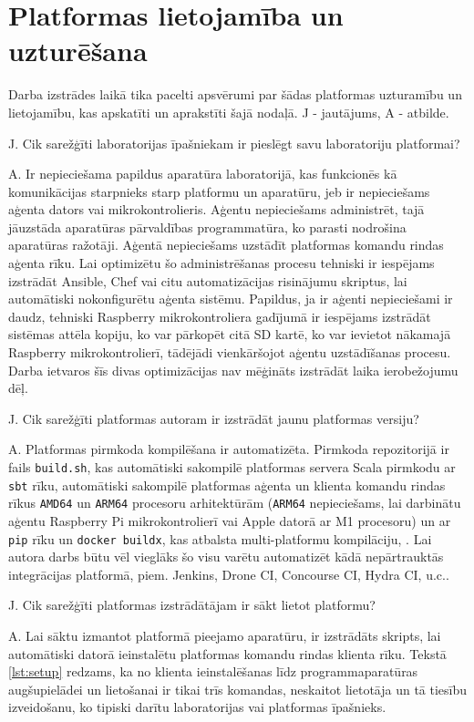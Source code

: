 \section{Platformas lietojamība un uzturēšana}
\label{sec:maintenance}

Darba izstrādes laikā tika pacelti apsvērumi par šādas platformas uzturamību un
lietojamību, kas apskatīti un aprakstīti šajā nodaļā. J - jautājums, A -
atbilde.

J. Cik sarežģīti laboratorijas īpašniekam ir pieslēgt savu laboratoriju
platformai?

A. Ir nepieciešama papildus aparatūra laboratorijā, kas funkcionēs kā
komunikācijas starpnieks starp platformu un aparatūru, jeb ir nepieciešams
aģenta dators vai mikrokontrolieris. Aģentu nepieciešams administrēt, tajā
jāuzstāda aparatūras pārvaldības programmatūra, ko parasti nodrošina aparatūras
ražotāji. Aģentā nepieciešams uzstādīt platformas komandu rindas aģenta rīku.
Lai optimizētu šo administrēšanas procesu tehniski ir iespējams izstrādāt
Ansible, Chef vai citu automatizācijas risinājumu skriptus, lai automātiski
nokonfigurētu aģenta sistēmu. Papildus, ja ir aģenti nepieciešami ir daudz,
tehniski Raspberry mikrokontroliera gadījumā ir iespējams izstrādāt sistēmas
attēla kopiju, ko var pārkopēt citā SD kartē, ko var ievietot nākamajā Raspberry
mikrokontrolierī, tādējādi vienkāršojot aģentu uzstādīšanas procesu. Darba
ietvaros šīs divas optimizācijas nav mēģināts izstrādāt laika ierobežojumu dēļ.

J. Cik sarežģīti platformas autoram ir izstrādāt jaunu platformas versiju?

A. Platformas pirmkoda kompilēšana ir automatizēta. Pirmkoda repozitorijā ir
fails \lstinline!build.sh!, kas automātiski sakompilē platformas servera Scala
pirmkodu ar \lstinline!sbt! rīku, automātiski sakompilē platformas aģenta un
klienta komandu rindas rīkus \lstinline!AMD64! un \lstinline!ARM64! procesoru
arhitektūrām (\lstinline!ARM64! nepieciešams, lai darbinātu aģentu Raspberry Pi
mikrokontrolierī vai Apple datorā ar M1 procesoru) un ar \lstinline!pip! rīku un
\lstinline!docker buildx!, kas atbalsta multi-platformu kompilāciju,
\cite{DockerBuildx}. Lai autora darbs būtu vēl vieglāks šo visu varētu
automatizēt kādā nepārtrauktās integrācijas platformā, piem. Jenkins, Drone CI,
Concourse CI, Hydra CI, u.c..

J. Cik sarežģīti platformas izstrādātājam ir sākt lietot platformu?

A. Lai sāktu izmantot platformā pieejamo aparatūru, ir izstrādāts skripts, lai
automātiski datorā ieinstalētu platformas komandu rindas klienta rīku. Tekstā
\ref{lst:setup} redzams, ka no klienta ieinstalēšanas līdz programmaparatūras
augšupielādei un lietošanai ir tikai trīs komandas, neskaitot lietotāja un tā
tiesību izveidošanu, ko tipiski darītu laboratorijas vai platformas īpašnieks.

